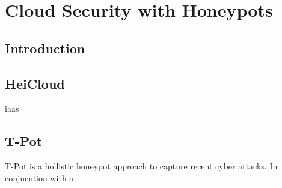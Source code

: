 \chapter{Cloud Security with Honeypots}

\section{Introduction}


\section{HeiCloud}

\ac{iaas}

\cite{heicloud2021}

\citet{Nithin2012}

\citet{Kelly2021}

\section{T-Pot}

T-Pot is a hollistic honeypot approach to capture recent cyber attacks. In conjucntion with a 

